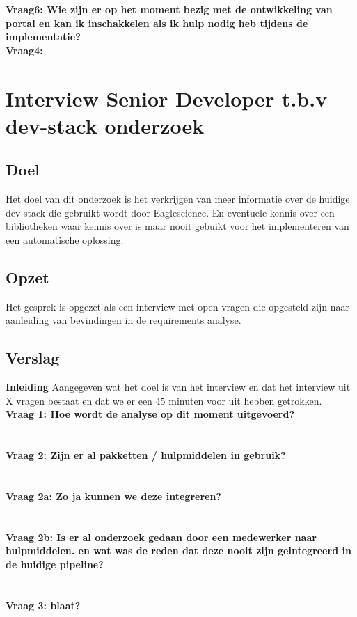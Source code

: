 \textbf{Vraag6: Wie zijn er op het moment bezig met de ontwikkeling van portal en kan ik inschakkelen als ik hulp nodig heb tijdens de implementatie?}
\lipsum[09]\\
\textbf{Vraag4: }
\lipsum[07]\\

\section{Interview Senior Developer t.b.v dev-stack onderzoek}
\subsection{Doel}
Het doel van dit onderzoek is het verkrijgen van meer informatie over de huidige dev-stack die gebruikt wordt door Eaglescience. En eventuele kennis over een bibliotheken waar kennis over is maar nooit gebuikt voor het implementeren van een automatische oplossing.
\subsection{Opzet}
Het gesprek is opgezet als een interview met open vragen die opgesteld zijn naar aanleiding van bevindingen in de requirements analyse.
\subsection{Verslag}
\textbf{Inleiding}
Aangegeven wat het doel is van het interview en dat het interview uit X vragen bestaat en dat we er een 45 minuten voor uit hebben getrokken.\\
\textbf{Vraag 1: Hoe wordt de analyse op dit moment uitgevoerd?}\\
\lipsum[01]\\
\\
\textbf{Vraag 2: Zijn er al pakketten / hulpmiddelen in gebruik?}\\
\lipsum[02]\\
\\
\textbf{Vraag 2a: Zo ja kunnen we deze integreren?}\\
\lipsum[03]\\
\\
\textbf{Vraag 2b: Is er al onderzoek gedaan door een medewerker naar hulpmiddelen. en wat was de reden dat deze nooit zijn geintegreerd in de huidige pipeline?}\\
\lipsum[04]\\
\\
\textbf{Vraag 3: blaat?}\\
\lipsum[05]\\

